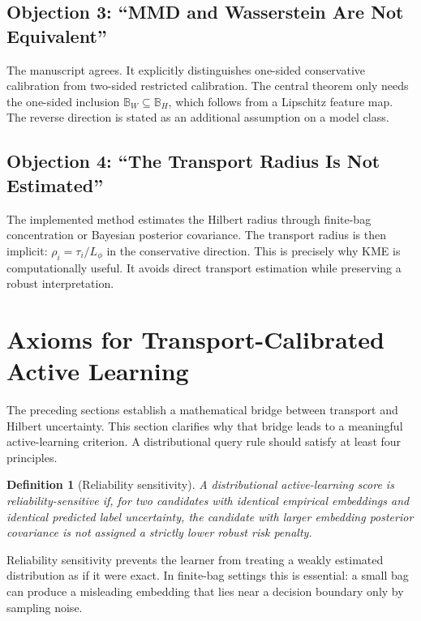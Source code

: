 \documentclass[10pt,journal]{IEEEtran}
\newtheorem{definition}{Definition}
\newcommand{\ball}{\mathbb{B}}
\begin{document}
\subsection{Objection 3: ``MMD and Wasserstein Are Not Equivalent''}

The manuscript agrees. It explicitly distinguishes one-sided conservative calibration from two-sided restricted calibration. The central theorem only needs the one-sided inclusion $\ball_W\subseteq\ball_H$, which follows from a Lipschitz feature map. The reverse direction is stated as an additional assumption on a model class.

\subsection{Objection 4: ``The Transport Radius Is Not Estimated''}

The implemented method estimates the Hilbert radius through finite-bag concentration or Bayesian posterior covariance. The transport radius is then implicit: $\rho_i=\tau_i/L_\phi$ in the conservative direction. This is precisely why KME is computationally useful. It avoids direct transport estimation while preserving a robust interpretation.


\section{Axioms for Transport-Calibrated Active Learning}
\label{sec:axioms}

The preceding sections establish a mathematical bridge between transport and Hilbert uncertainty. This section clarifies why that bridge leads to a meaningful active-learning criterion. A distributional query rule should satisfy at least four principles.

\begin{definition}[Reliability sensitivity]
A distributional active-learning score is reliability-sensitive if, for two candidates with identical empirical embeddings and identical predicted label uncertainty, the candidate with larger embedding posterior covariance is not assigned a strictly lower robust risk penalty.
\end{definition}

Reliability sensitivity prevents the learner from treating a weakly estimated distribution as if it were exact. In finite-bag settings this is essential: a small bag can produce a misleading embedding that lies near a decision boundary only by sampling noise.
\end{document}
